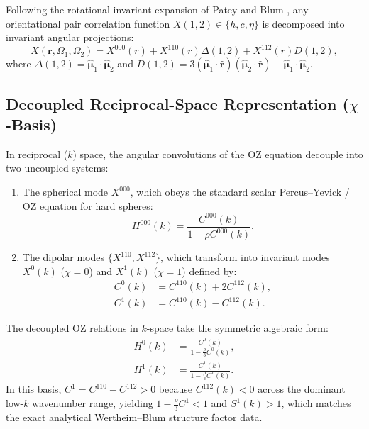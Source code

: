 \documentclass[11pt,a4paper]{article}
\begin{document}
Following the rotational invariant expansion of Patey and Blum \cite{patey1977integral, blum1972mean}, any orientational pair correlation function $X(1,2) \in \{h, c, \eta\}$ is decomposed into invariant angular projections:
\begin{equation}
    X(\mathbf{r}, \Omega_1, \Omega_2) = X^{000}(r) + X^{110}(r) \Delta(1,2) + X^{112}(r) D(1,2),
\end{equation}
where $\Delta(1,2) = \hat{\bm{\mu}}_1 \cdot \hat{\bm{\mu}}_2$ and $D(1,2) = 3(\hat{\bm{\mu}}_1 \cdot \hat{\mathbf{r}})(\hat{\bm{\mu}}_2 \cdot \hat{\mathbf{r}}) - \hat{\bm{\mu}}_1 \cdot \hat{\bm{\mu}}_2$.

\subsection{Decoupled Reciprocal-Space Representation (\texorpdfstring{$\chi$}{chi}-Basis)}

In reciprocal ($k$) space, the angular convolutions of the OZ equation decouple into two uncoupled systems:
\begin{enumerate}
    \item The spherical mode $X^{000}$, which obeys the standard scalar Percus--Yevick / OZ equation for hard spheres:
    \begin{equation}
        H^{000}(k) = \frac{C^{000}(k)}{1 - \rho C^{000}(k)}.
    \end{equation}
    \item The dipolar modes $\{X^{110}, X^{112}\}$, which transform into invariant modes $X^0(k)$ ($\chi=0$) and $X^1(k)$ ($\chi=1$) defined by:
    \begin{align}
        C^0(k) &= C^{110}(k) + 2 C^{112}(k), \\
        C^1(k) &= C^{110}(k) - C^{112}(k).
    \end{align}
\end{enumerate}

The decoupled OZ relations in $k$-space take the symmetric algebraic form:
\begin{align}
    H^0(k) &= \frac{C^0(k)}{1 - \frac{\rho}{3} C^0(k)}, \label{eq:oz_chi0} \\
    H^1(k) &= \frac{C^1(k)}{1 - \frac{\rho}{3} C^1(k)}. \label{eq:oz_chi1}
\end{align}
In this basis, $C^1 = C^{110} - C^{112} > 0$ because $C^{112}(k) < 0$ across the dominant low-$k$ wavenumber range, yielding $1 - \frac{\rho}{3} C^1 < 1$ and $S^1(k) > 1$, which matches the exact analytical Wertheim--Blum structure factor data.
\end{document}
